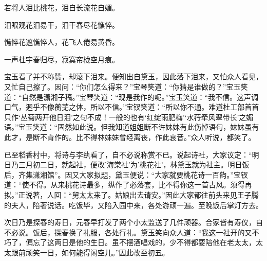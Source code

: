 \begin{poem}
\begin{pl}
        若将人泪比桃花，泪自长流花自媚。
    \end{pl}
    \begin{pl}

        泪眼观花泪易干，泪干春尽花憔悴。
    \end{pl}
    \begin{pl}

        憔悴花遮憔悴人，花飞人倦易黄昏。
    \end{pl}
    \begin{pl}

        一声杜宇春归尽，寂寞帘栊空月痕。
    \end{pl}

\end{poem}


\begin{parag}
    宝玉看了并不称赞，却滚下泪来。便知出自黛玉，因此落下泪来，又怕众人看见，又忙自己擦了。因问：“你们怎么得来？”宝琴笑道：“你猜是谁做的？”宝玉笑道：“自然是潇湘子稿。”宝琴笑道：“现是我作的呢。”宝玉笑道：“我不信。这声调口气，迥乎不像蘅芜之体，所以不信。”宝钗笑道：“所以你不通。难道杜工部首首只作‘丛菊两开他日泪’之句不成！一般的也有‘红绽雨肥梅’‘水荇牵风翠带长’之媚语。”宝玉笑道：“固然如此说。但我知道姐姐断不许妹妹有此伤悼语句，妹妹虽有此才，是断不肯作的。比不得林妹妹曾经离丧，作此哀音。”众人听说，都笑了。
\end{parag}


\begin{parag}
    已至稻香村中，将诗与李纨看了，自不必说称赏不已。说起诗社，大家议定：“明日乃三月初二日，就起社，便改'海棠社'为'桃花社'，林黛玉就为社主。明日饭后，齐集潇湘馆”。因又大家拟题，黛玉便说：“大家就要桃花诗一百韵。”宝钗道：“使不得。从来桃花诗最多，纵作了必落套，比不得你这一首古风。须得再拟。”正说著，人回：“舅太太来了。姑娘出去请安。”因此大家都往前头来见王子腾的夫人，陪著说话。吃饭毕，又陪入园中来，各处游顽一遍。至晚饭后掌灯方去。
\end{parag}


\begin{parag}
    次日乃是探春的寿日，元春早打发了两个小太监送了几件顽器。合家皆有寿仪，自不必说。饭后，探春换了礼服，各处行礼。黛玉笑向众人道：“我这一社开的又不巧了，偏忘了这两日是他的生日。虽不摆酒唱戏的，少不得都要陪他在老太太，太太跟前顽笑一日，如何能得闲空儿。”因此改至初五。
\end{parag}


